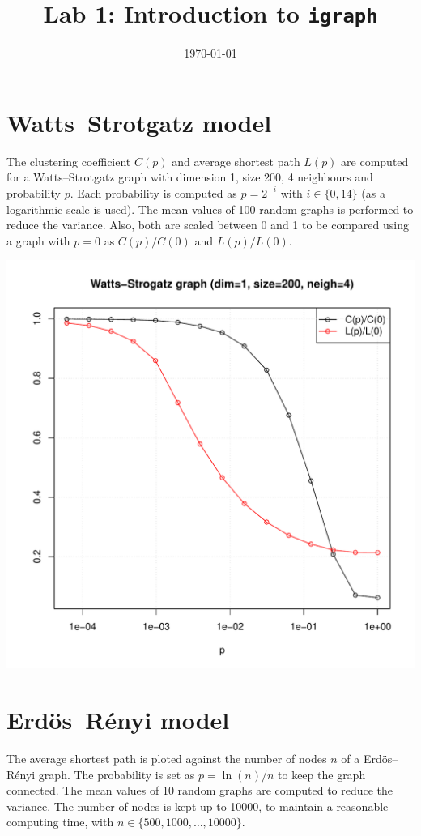 \documentclass[12pt,a4paper]{article}
\title{Lab 1: Introduction to \texttt{igraph}}
\date{\today}
\begin{document}
\maketitle

\section{Watts--Strotgatz model}

The clustering coefficient $C(p)$ and average shortest path $L(p)$ are computed 
for a Watts--Strotgatz graph with dimension 1, size 200, 4 neighbours and 
probability $p$. Each probability is computed as $p = 2^{-i}$ with $i \in \{0, 
14\}$ (as a logarithmic scale is used). The mean values of 100 random graphs is 
performed to reduce the variance. Also, both are scaled between 0 and 1 to be 
compared using a graph with $p=0$ as $C(p)/C(0)$ and $L(p)/L(0)$.

\begin{center}
\includegraphics[width=.8\textwidth]{ws.pdf}
\end{center}

\section{Erdös--Rényi model}

The average shortest path is ploted against the number of nodes $n$ of a 
Erdös--Rényi graph. The probability is set as $p = \ln(n)/n$ to keep the graph 
connected. The mean values of 10 random graphs are computed to reduce the 
variance. The number of nodes is kept up to 10000, to maintain a reasonable 
computing time, with $n \in \{500, 1000, \ldots, 10000\}$.
\end{document}
